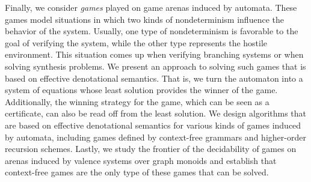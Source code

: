 \documentclass[../../diss.tex]{subfiles}
\begin{document}
Finally, we consider \emph{games} played on game arenas induced by automata.
These games model situations in which two kinds of nondeterminism influence the behavior of the system.
Usually, one type of nondeterminism is favorable to the goal of verifying the system, while the other type represents the hostile environment.
This situation comes up \eg when verifying branching systems or when solving synthesis problems.
We present an approach to solving such games that is based on effective denotational semantics.
That is, we turn the automaton into a system of equations whose least solution provides the winner of the game.
Additionally, the winning strategy for the game, which can be seen as a certificate, can also be read off from the least solution.
We design algorithms that are based on effective denotational semantics for various kinds of games induced by automata, including games defined by context-free grammars and higher-order recursion schemes.
Lastly, we study the frontier of the decidability of games on arenas induced by valence systems over graph monoids and establish that context-free games are the only type of these games that can be solved.
\end{document}
